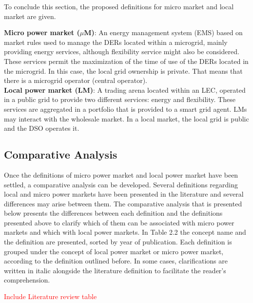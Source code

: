 To conclude this section, the proposed definitions for micro market and local market are given.

\begin{tcolorbox}
\textbf{Micro power market ($\mu$M)}: An energy management system (EMS) based on market rules used to
manage the DERs located within a microgrid, mainly providing energy services, although flexibility service
might also be considered. These services permit the maximization of the time of use of the DERs located in
the microgrid. In this case, the local grid ownership is private. That means that there is a microgrid operator
(central operator).\\
\newline
\textbf{Local power market (LM)}: A trading arena located within an LEC, operated in a public grid to provide
two different services: energy and flexibility. These services are aggregated in a portfolio that is provided to
a smart grid agent. LMs may interact with the wholesale market.
In a local market, the local grid is public and the DSO operates it.
\end{tcolorbox}

\subsection{Comparative Analysis}
Once the definitions of micro power market and local power market have been settled, a comparative analysis can be developed. Several definitions regarding local and micro power markets have been presented in the literature and several differences may arise between them. The comparative analysis that is presented below presents the differences between each definition and the definitions presented above to clarify which of them can be associated with micro power markets and which with local power markets. In Table 2.2 the
concept name and the definition are presented, sorted by year of publication. Each definition is grouped under the concept of local power market or micro power market, according to the definition outlined before. In some cases, clarifications are written in italic alongside the literature definition to facilitate the reader's comprehension.

\textcolor{red}{Include Literature review table}

